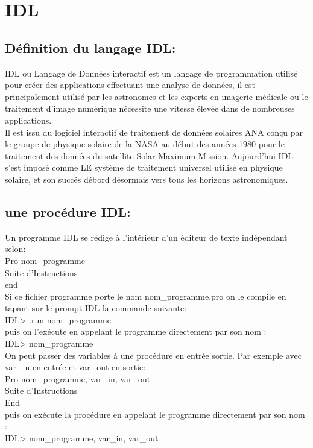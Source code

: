 \chapter{IDL}

\section{Définition du langage IDL:}

IDL ou Langage de Données interactif est un langage de programmation utilisé pour créer des applications effectuant une analyse de données, il est principalement utilisé par les astronomes et les experts en imagerie médicale ou le traitement d'image numérique nécessite une vitesse élevée dans de nombreuses applications.\\
Il est issu du logiciel interactif de traitement de données solaires ANA conçu par le groupe de physique solaire de la NASA au début des années 1980 pour le traitement des données du satellite Solar Maximum Mission. Aujourd'hui IDL s'est imposé comme LE système de traitement universel utilisé en physique solaire, et son succés débord désormais vers tous les horizons astronomiques.

 \section{une procédure IDL:}
 Un programme IDL se rédige à l’intérieur d'un éditeur de texte indépendant selon:\\
Pro nom\_programme\\
   Suite d’Instructions\\
end\\
Si ce fichier programme porte le nom nom\_programme.pro on le compile en tapant sur
le prompt IDL la commande suivante:\\
IDL> .run nom\_programme\\
puis on l’exécute en appelant le programme directement par son nom :\\
IDL> nom\_programme\\
On peut passer des variables à une procédure en entrée sortie. Par exemple avec var\_in
en entrée et var\_out en sortie:\\
Pro nom\_programme, var\_in, var\_out\\
  Suite d’Instructions\\
End\\
puis on exécute la procédure en appelant le programme directement par son nom :\\
IDL> nom\_programme, var\_in, var\_out


